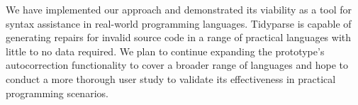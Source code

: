 \documentclass[sigplan,review,acmsmall,nonacm,screen,anonymous]{acmart}\settopmatter{printfolios=false,printccs=false,printacmref=false}
\begin{document}



We have implemented our approach and demonstrated its viability as a tool for syntax assistance in real-world programming languages. Tidyparse is capable of generating repairs for invalid source code in a range of practical languages with little to no data required. We plan to continue expanding the prototype's autocorrection functionality to cover a broader range of languages and hope to conduct a more thorough user study to validate its effectiveness in practical programming scenarios.
\end{document}
